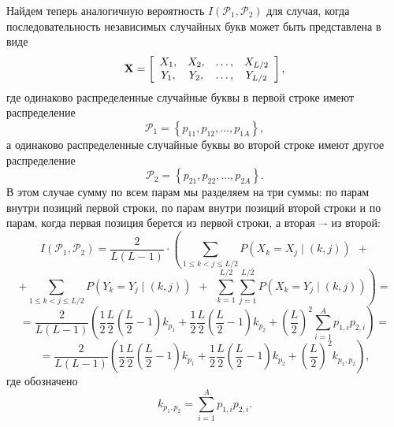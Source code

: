 Найдем теперь аналогичную вероятность $I\left( {\mathcal{P}_1 ,\mathcal{P}_2 } \right)$  для случая, когда последовательность независимых случайных букв может быть представлена в виде
\[
\mathbf{X} = \left[ {\begin{array}{*{20}c}
   {X_1 ,}  \\
   {Y_1 ,}  \\
 \end{array} \begin{array}{*{20}c}
   {X_2 ,}  \\
   {Y_2 ,}  \\
 \end{array} \begin{array}{*{20}c}
   { \ldots ,}  \\
   { \ldots ,}  \\
 \end{array} \begin{array}{*{20}c}
   {X_{L/2} }  \\
   {Y_{L/2} }  \\
 \end{array} } \right],
\]
где одинаково распределенные случайные буквы в первой строке имеют распределение
    \[ \mathcal{P}_1  = \left\{ {p_{11} ,p_{12} ,  \ldots , p_{1A} } \right\}, \]
а одинаково распределенные случайные буквы во второй строке имеют другое распределение
    \[ \mathcal{P}_2  = \left\{ {p_{21} ,p_{22} ,  \ldots , p_{2A} } \right\}. \]
В этом случае сумму по всем парам мы разделяем на три суммы: по парам внутри позиций первой строки, по парам внутри позиций второй строки и по парам, когда первая позиция берется из первой строки, а вторая –- из второй:
{ \small
\[
    I(\mathcal{P}_1, \mathcal{P}_2) =
        \frac{2}{L(L - 1)} \cdot \left(
        \sum \limits_{1 \leq k < j \leq L/2} P( X_k  = X_j \mid ( k,j )) ~~ + \right.
\] \[
        \left. + \sum\limits_{1 \leq k < j \leq L/2} P(Y_k  = Y_j \mid (k,j)) ~~+~~
            \sum\limits_{k=1}^{L/2} \sum\limits_{j=1}^{L/2} {P(X_k = Y_j \mid (k,j))} \right) =
\] \[
    = \frac{2}{L(L - 1)} \left( \frac{1}{2} \frac{L}{2} \left( \frac{L}{2} - 1 \right) k_{p_1} +
        \frac{1}{2} \frac{L}{2} \left( \frac{L}{2} - 1 \right) k_{p_2} +
        \left( \frac{L}{2} \right)^2 \sum \limits_{i = 1}^A p_{1,i} p_{2,i} \right) =
\] \[
    = \frac{2}{L(L - 1)} \left( \frac{1}{2} \frac{L}{2} \left( \frac{L}{2} - 1 \right) k_{p_1} +
        \frac{1}{2} \frac{L}{2} \left( \frac{L}{2} - 1 \right) k_{p_2} +
        \left( \frac{L}{2} \right)^2 k_{p_1, p_2} \right),
\] }
где обозначено
    \[ k_{p_1, p_2}  = \sum\limits_{i=1}^A p_{1,i} p_{2,i}. \]


